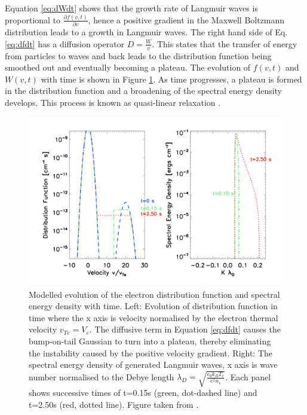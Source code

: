 Equation \ref{eq:dWdt} shows that the growth rate of Langmuir waves is proportional to $\frac{\partial f(v,t)}{\partial v}$, hence a positive gradient in the Maxwell Boltzmann distribution leads to a growth in Langmuir waves. The right hand side of Eq. \ref{eq:dfdt} has a diffusion operator $D=\frac{W}{v}$. This states that the transfer of energy from particles to waves and back leads to the distribution function being smoothed out and eventually becoming a plateau. The evolution of $f(v,t)$ and $W(v,t)$ with time is shown in Figure \ref{fig:Lwavegrowth}.  As time progresses, a plateau is formed in the distribution function and a broadening of the spectral energy density develops.	 This process is known as quasi-linear relaxation \citep{Melrose1987}.
\begin{figure}[ht]
    \centering
    \includegraphics[width=\columnwidth]{Images/L_wave_growth.png}
    \caption[Langmuir wave distriburtion function and spectral energy density.]{Modelled evolution of the electron distribution function and spectral energy density with time. Left: Evolution of distribution function in time where the x axis is velocity normalised by the electron thermal velocity $v_{Te}=V_e$. The diffusive term in Equation \ref{eq:dfdt} causes the bump-on-tail Gaussian to turn into a plateau, thereby eliminating the instability caused by the positive velocity gradient. Right: The spectral energy density of generated Langmuir waves, x axis is wave number normalised to the Debye length $\lambda_D=\sqrt{\frac{\epsilon_0 k_B T_e}{e^2 n_e}}$. Each panel shows successive times of t=0.15s (green, dot-dashed line) and t=2.50s (red, dotted line). Figure taken from \cite{Reid2014}.} %
    \label{fig:Lwavegrowth}
\end{figure}

